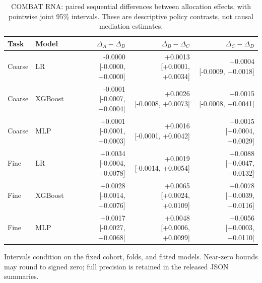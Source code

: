 \begin{table}[htbp]\centering\small
\setlength{\tabcolsep}{5pt}\renewcommand{\arraystretch}{1.2}
\caption{COMBAT RNA: paired sequential differences between allocation effects, with pointwise joint 95\% intervals. These are descriptive policy contrasts, not causal mediation estimates.}
\begin{tabular}{llrrr}\toprule
Task & Model & $\Delta_A-\Delta_B$ & $\Delta_B-\Delta_C$ & $\Delta_C-\Delta_D$ \\\midrule
Coarse & LR & \makecell{-0.0000\\{[-0.0000, +0.0000]}} & \makecell{+0.0013\\{[+0.0001, +0.0034]}} & \makecell{+0.0004\\{[-0.0009, +0.0018]}} \\
Coarse & XGBoost & \makecell{-0.0001\\{[-0.0007, +0.0004]}} & \makecell{+0.0026\\{[-0.0008, +0.0073]}} & \makecell{+0.0015\\{[-0.0008, +0.0041]}} \\
Coarse & MLP & \makecell{+0.0001\\{[-0.0001, +0.0003]}} & \makecell{+0.0016\\{[-0.0001, +0.0042]}} & \makecell{+0.0015\\{[+0.0004, +0.0029]}} \\
Fine & LR & \makecell{+0.0034\\{[-0.0004, +0.0078]}} & \makecell{+0.0019\\{[-0.0014, +0.0054]}} & \makecell{+0.0088\\{[+0.0047, +0.0132]}} \\
Fine & XGBoost & \makecell{+0.0028\\{[-0.0014, +0.0076]}} & \makecell{+0.0065\\{[+0.0024, +0.0109]}} & \makecell{+0.0078\\{[+0.0039, +0.0116]}} \\
Fine & MLP & \makecell{+0.0017\\{[-0.0027, +0.0068]}} & \makecell{+0.0048\\{[+0.0006, +0.0099]}} & \makecell{+0.0056\\{[+0.0003, +0.0110]}} \\
\bottomrule\end{tabular}\end{table}
Intervals condition on the fixed cohort, folds, and fitted models. Near-zero bounds may round to signed zero; full precision is retained in the released JSON summaries.
\clearpage
